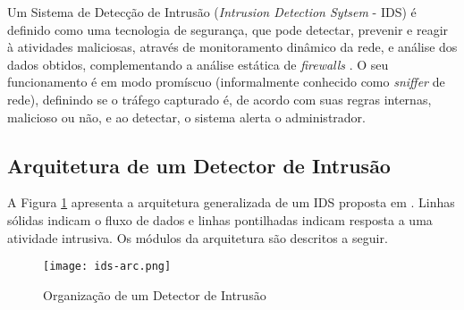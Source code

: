 Um Sistema de Detecção de Intrusão (\textit{Intrusion Detection Sytsem} - IDS) é definido como uma tecnologia de segurança, que pode detectar, prevenir e reagir à atividades maliciosas, através de monitoramento dinâmico da rede, e análise dos dados obtidos, complementando a análise estática de \textit{firewalls} \citep{Patcha2007}. O seu funcionamento é em modo promíscuo (informalmente conhecido como \textit{sniffer} de rede), definindo se o tráfego capturado é, de acordo com suas regras internas, malicioso ou não, e ao detectar, o sistema alerta o administrador.




\subsection{Arquitetura de um Detector de Intrusão}
\label{ids:arq}
A Figura \ref{fig:ids-arq} apresenta a arquitetura generalizada de um IDS proposta em \citep{Axelsson2000}. Linhas sólidas indicam o fluxo de dados e linhas pontilhadas indicam resposta a uma atividade intrusiva. Os módulos da arquitetura são descritos a seguir.
\begin{figure}[tbh!]
    \centering
    \texttt{[image: ids-arc.png]}
    \caption{Organização de um Detector de Intrusão}
    \label{fig:ids-arq}
\end{figure}

